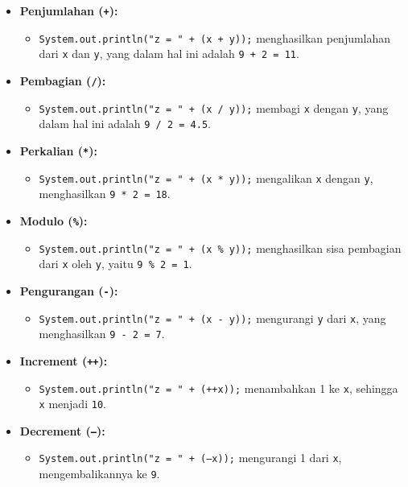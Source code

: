 \begin{itemize}
	\item \textbf{Penjumlahan (\texttt{+}):} 
	\begin{itemize}
		\item \texttt{System.out.println("z = " + (x + y));} menghasilkan penjumlahan dari \texttt{x} dan \texttt{y}, yang dalam hal ini adalah \texttt{9 + 2 = 11}.
	\end{itemize}
	
	\item \textbf{Pembagian (\texttt{/}):}
	\begin{itemize}
		\item \texttt{System.out.println("z = " + (x / y));} membagi \texttt{x} dengan \texttt{y}, yang dalam hal ini adalah \texttt{9 / 2 = 4.5}.
	\end{itemize}
	
	\item \textbf{Perkalian (\texttt{*}):}
	\begin{itemize}
		\item \texttt{System.out.println("z = " + (x * y));} mengalikan \texttt{x} dengan \texttt{y}, menghasilkan \texttt{9 * 2 = 18}.
	\end{itemize}
	
	\item \textbf{Modulo (\texttt{\%}):}
	\begin{itemize}
		\item \texttt{System.out.println("z = " + (x \% y));} menghasilkan sisa pembagian dari \texttt{x} oleh \texttt{y}, yaitu \texttt{9 \% 2 = 1}.
	\end{itemize}
	
	\item \textbf{Pengurangan (\texttt{-}):}
	\begin{itemize}
		\item \texttt{System.out.println("z = " + (x - y));} mengurangi \texttt{y} dari \texttt{x}, yang menghasilkan \texttt{9 - 2 = 7}.
	\end{itemize}
	
	\item \textbf{Increment (\texttt{++}):}
	\begin{itemize}
		\item \texttt{System.out.println("z = " + (++x));} menambahkan 1 ke \texttt{x}, sehingga \texttt{x} menjadi \texttt{10}.
	\end{itemize}
	
	\item \textbf{Decrement (\texttt{--}):}
	\begin{itemize}
		\item \texttt{System.out.println("z = " + (--x));} mengurangi 1 dari \texttt{x}, mengembalikannya ke \texttt{9}.
	\end{itemize}
	

\end{itemize}
